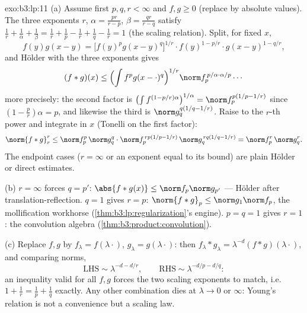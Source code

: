 \begin{solution}{exo:b3:lp:11}
(a) Assume first $p, q, r < \infty$ and $f, g \geq 0$
(replace by absolute values). The three exponents $r$,
$\alpha = \frac{pr}{r-p}$, $\beta = \frac{qr}{r-q}$
satisfy $\frac1r + \frac1\alpha + \frac1\beta = \frac1r +
\frac1p - \frac1r + \frac1q - \frac1r = 1$ (the scaling
relation). Split, for fixed $x$,
\[
f(y)g(x-y) = \bigl[f(y)^pg(x-y)^q\bigr]^{1/r}\cdot
f(y)^{1 - p/r}\cdot g(x-y)^{1 - q/r},
\]
and H\"older with the three exponents gives
\[
(f*g)(x) \leq \Bigl(\int f^pg(x-\cdot)^q\Bigr)^{1/r}
\norm f_p^{\,p/\alpha\cdot\alpha/p}\cdots
\]
more precisely: the second factor is
$\bigl(\int f^{(1-p/r)\alpha}\bigr)^{1/\alpha} =
\norm f_p^{p(1/p - 1/r)}$ since $(1 - \frac pr)\alpha = p$,
and likewise the third is $\norm g_q^{q(1/q - 1/r)}$. Raise
to the $r$-th power and integrate in $x$ (Tonelli on the
first factor):
\[
\norm{f*g}_r^r \leq \norm f_p^p\,\norm g_q^q\cdot
\norm f_p^{\,rp(1/p - 1/r)}\,\norm g_q^{\,rq(1/q - 1/r)}
= \norm f_p^r\,\norm g_q^r .
\]
The endpoint cases ($r = \infty$ or an exponent equal to
its bound) are plain H\"older or direct estimates.

(b) $r = \infty$ forces $q = p'$: $\abs{f*g(x)} \leq \norm
f_p\norm g_{p'}$ --- H\"older after translation-reflection.
$q = 1$ gives $r = p$: $\norm{f*g}_p \leq \norm
g_1\norm f_p$, the mollification workhorse
(\cref{thm:b3:lp:regularization}'s engine). $p = q = 1$
gives $r = 1$: the convolution algebra
(\cref{thm:b3:product:convolution}).

(c) Replace $f, g$ by $f_\lambda = f(\lambda\cdot)$,
$g_\lambda = g(\lambda\cdot)$: then $f_\lambda*g_\lambda =
\lambda^{-d}(f*g)(\lambda\cdot)$, and comparing norms,
\[
\text{LHS} \sim \lambda^{-d - d/r}, \qquad
\text{RHS} \sim \lambda^{-d/p - d/q} :
\]
an inequality valid for all $f, g$ forces the two scaling
exponents to match, i.e.\ $1 + \frac1r = \frac1p + \frac1q$
exactly. Any other combination dies at $\lambda \to 0$ or
$\infty$: Young's relation is not a convenience but a
scaling law.
\end{solution}

